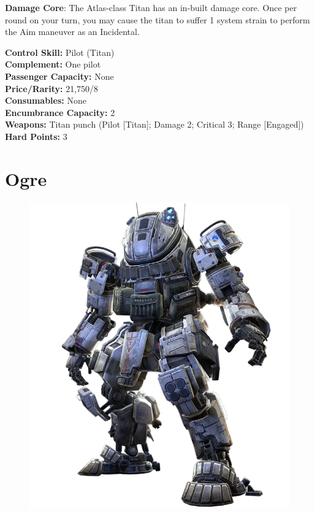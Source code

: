 \documentclass[9pt, openany]{extbook}
\begin{document}
\textbf{Damage Core}: The Atlas-class Titan has an in-built damage core. Once per round on your turn, you may cause the titan to suffer 1 system strain to perform the Aim maneuver as an Incidental.\\[1em]


\begin{multicols}{2}
\noindent\textbf{Control Skill:} Pilot (Titan)\\
\noindent\textbf{Complement:} One pilot\\
\noindent\textbf{Passenger Capacity:} None\\
\noindent\textbf{Price/Rarity:} 21,750/8\\
\noindent\textbf{Consumables:} None\\
\noindent\textbf{Encumbrance Capacity:} 2\\
\noindent\textbf{Weapons:} Titan punch (Pilot [Titan]; Damage 2; Critical 3; Range [Engaged])\\
\noindent\textbf{Hard Points:} 3
\end{multicols}

\vspace*{\fill}
\pagebreak

\section{Ogre}
\label{sec:ogre}
\begin{figure}
\vspace*{-2em}
\includegraphics[width=\linewidth]{Ogre}
\end{figure}
\end{document}
